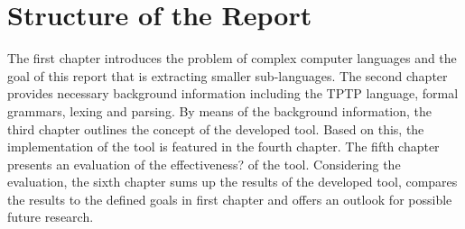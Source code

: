 \section{Structure of the Report}\label{sec:IntroductionStructure}
The first chapter introduces the problem of complex computer languages and the goal of this report that is extracting smaller sub-languages.
The second chapter provides necessary background information including the \ac{TPTP} language, formal grammars, lexing and parsing. By means of the background information, the third chapter outlines the concept of the developed tool.
Based on this, the implementation of the tool is featured in the fourth chapter.
The fifth chapter presents an evaluation of the effectiveness? of the tool. Considering the evaluation, the sixth chapter sums up the results of the developed tool, compares the results to the defined goals in first chapter and offers an outlook for possible future research.